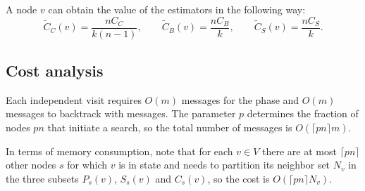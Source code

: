 A node $v$ can obtain the value of the estimators in the following way:
\begin{equation*}
\widetilde{C}_C(v) = \frac{n C_C}{k(n-1)} , \qquad
\widetilde{C}_B(v) = \frac{n C_B}{k} , \qquad
\widetilde{C}_S(v) = \frac{n C_S}{k} .
\end{equation*}

\subsection{Cost analysis}

Each independent visit requires $O(m)$ messages for the \mdisc{} phase and $O(m)$ messages to backtrack with \mrep{} messages. The parameter $p$ determines the fraction of nodes $pn$ that initiate a \mdisc{} search, so the total number of messages is $O(\lceil pn \rceil m)$.

In terms of memory consumption, note that for each $v \in V$ there are at most $\lceil pn \rceil$ other nodes $s$ for which $v$ is in state  and needs to partition its neighbor set $N_v$ in the three subsets $P_s(v)$, $S_s(v)$ and $C_s(v)$, so the cost is $O(\lceil pn \rceil N_v)$.